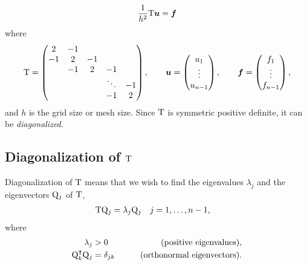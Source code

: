 \begin{align*}
  \frac{1}{h^2} {\mathrm T} {{\boldsymbol u}} = {\boldsymbol f}
\end{align*}
where
\begin{align*}
  {\mathrm T} =
  \begin{pmatrix}
    2 & -1 & & & \\
    -1 & 2 & -1 & & \\
    & -1 & 2 & -1 & \\
    & & & \ddots & -1 \\
    & & & -1 & 2
  \end{pmatrix} , \qquad
  {{\boldsymbol u}} =
  \begin{pmatrix}
    u_1 \\
    \vdots \\
    u_{n-1}
  \end{pmatrix} , \qquad
  {\boldsymbol f} =
  \begin{pmatrix}
    f_1 \\
    \vdots \\
    f_{n-1}
  \end{pmatrix},
\end{align*}
and $h$ is the grid size or mesh size. Since ${\mathrm T}$ is symmetric
positive definite, it can be \emph{diagonalized}.

\subsection{Diagonalization of ${\mathrm T}$}

Diagonalization of ${\mathrm T}$ means that we wish to find the eigenvalues
$\lambda_j$ and the eigenvectors ${\mathrm Q}_j$ of ${\mathrm T}$,
\begin{align*}
  {\mathrm T} {\mathrm Q}_j &= \lambda_j {\mathrm Q}_j \quad j=1,\ldots,n-1,
\end{align*}
where
\begin{align*}
  \lambda_j &> 0 \qquad &\text{(positive eigenvalues)}, \\
  {\mathrm Q}_k^\intercal {\mathrm Q}_j &= \delta_{jk} \qquad &\text{(orthonormal eigenvectors)}.
\end{align*}

